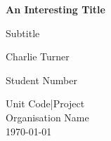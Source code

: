 \begin{titlepage}
    \begin{center}
        \vspace*{1cm}

        \Huge
        \textbf{An Interesting Title}

        \vspace{0.25cm}
        \large
        Subtitle

        \vspace{1.5cm}

        Charlie Turner

        Student Number

        \vfill

        \vspace{0.8cm}

        \normalsize
        Unit Code|Project\\ Organisation Name\\ \today
    \end{center}
\end{titlepage}